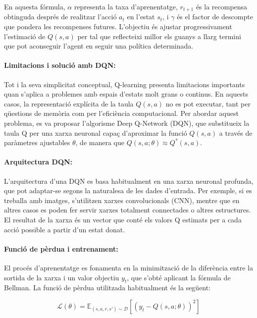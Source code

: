 \documentclass[12pt,a4paper,twoside]{book}
\begin{document}
En aquesta fórmula, $\alpha$ representa la taxa d’aprenentatge, $r_{t+1}$ és la recompensa obtinguda després de realitzar l’acció $a_t$ en l’estat $s_t$, i $\gamma$ és el factor de descompte que pondera les recompenses futures. L’objectiu és ajustar progressivament l’estimació de $Q(s,a)$ per tal que reflecteixi millor els guanys a llarg termini que pot aconseguir l’agent en seguir una política determinada.

\paragraph{Limitacions i solució amb DQN:}

Tot i la seva simplicitat conceptual, Q-learning presenta limitacions importants quan s’aplica a problemes amb espais d’estats molt grans o continus. En aquests casos, la representació explícita de la taula $Q(s,a)$ no es pot executar, tant per qüestions de memòria com per l'eficiència computacional. Per abordar aquest problema, es va proposar l’algorisme Deep Q-Network (DQN), que substitueix la taula Q per una xarxa neuronal capaç d’aproximar la funció $Q(s,a)$ a través de paràmetres ajustables $\theta$, de manera que $Q(s,a; \theta) \approx Q^*(s,a)$.


\paragraph{Arquitectura DQN:}

L’arquitectura d’una DQN es basa habitualment en una xarxa neuronal profunda, que pot adaptar-se segons la naturalesa de les dades d’entrada. Per exemple, si es treballa amb imatges, s’utilitzen xarxes convolucionals (CNN), mentre que en altres casos es poden fer servir xarxes totalment connectades o altres estructures. El resultat de la xarxa és un vector que conté els valors Q estimats per a cada acció possible a partir d’un estat donat.


\paragraph{Funció de pèrdua i entrenament:}
El procés d’aprenentatge es fonamenta en la minimització de la diferència entre la sortida de la xarxa i un valor objectiu $y_t$, que s’obté aplicant la fórmula de Bellman. La funció de pèrdua utilitzada habitualment és la següent:

\begin{equation}
\mathcal{L}(\theta) = \mathbb{E}_{(s,a,r,s') \sim \mathcal{D}} \left[ \left( y_t - Q(s, a; \theta) \right)^2 \right]
\end{equation}
\end{document}
